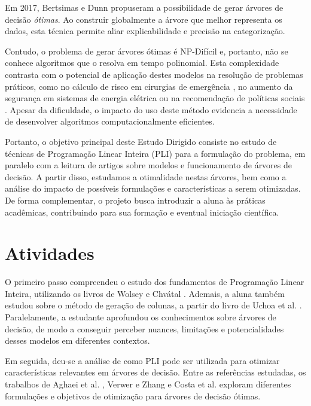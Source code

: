 \documentclass[12pt,a4paper]{article}
\begin{document}
Em 2017, Bertsimas e Dunn \cite{Bertsimas2017} propuseram a possibilidade de gerar árvores de decisão \emph{ótimas}. Ao construir globalmente a árvore que melhor representa os dados, esta técnica permite aliar explicabilidade e precisão na categorização. 

Contudo, o problema de gerar árvores ótimas é NP-Difícil \cite{Hyafil1976} e, portanto, não se conhece algoritmos que o resolva em tempo polinomial.
Esta complexidade contrasta com o potencial de aplicação destes
modelos na resolução de problemas práticos, como no cálculo de risco em cirurgias
de emergência \cite{Bertsimas2018}, no aumento da segurança em sistemas
de energia elétrica \cite{Genc2010} ou na recomendação de políticas sociais \cite{Chan2019}.
Apesar da dificuldade, o impacto do uso deste método evidencia a necessidade
de desenvolver algoritmos computacionalmente eficientes. 

Portanto, o objetivo principal deste Estudo Dirigido consiste no estudo de técnicas de
Programação Linear Inteira (PLI) para a formulação do problema, em paralelo com a leitura
de artigos sobre modelos e funcionamento de árvores de decisão.
A partir disso, estudamos a otimalidade nestas árvores,
bem como a análise do impacto de possíveis formulações e características a serem otimizadas.
De forma complementar, o projeto busca introduzir a aluna às práticas acadêmicas,
contribuindo para sua formação e eventual iniciação científica.

\section{Atividades} \label{sec:atividades}

O primeiro passo compreendeu o estudo dos fundamentos de Programação Linear Inteira,
utilizando os livros de Wolsey \cite{Wolsey2021} e Chvátal \cite{Chvatal1983}. Ademais, a aluna
também estudou sobre o método de geração de colunas, a partir do livro de Uchoa et al. \cite{Uchoa2024}.
Paralelamente, a estudante aprofundou os conhecimentos sobre árvores de decisão, de modo a conseguir
perceber nuances, limitações e potencialidades desses modelos em diferentes contextos.

Em seguida, deu-se a análise de como PLI pode ser utilizada para otimizar características
relevantes em árvores de decisão. Entre as referências estudadas, os trabalhos de Aghaei et al.
\cite{Aghaei24}, Verwer e Zhang \cite{Verwer2019} e Costa et al. \cite{Costa2022} exploram 
diferentes formulações e objetivos de otimização para árvores de decisão ótimas.
\end{document}
